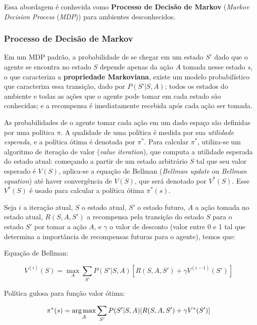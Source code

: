 Essa abordagem é conhecida como \textbf{Processo de Decisão de Markov} (\textit{Markov Decision Process} (\textit{MDP})) para ambientes desconhecidos.

\subsubsection{Processo de Decisão de Markov}
\label{sec:mdp}

Em um MDP padrão, a probabilidade de se chegar em um estado $S'$ dado que o agente se encontra no estado $S$ depende apenas da ação $A$ tomada nesse estado \textit{s}, o que caracteriza a \textbf{propriedade Markoviana}, existe um modelo probabilístico que caracteriza essa transição, dado por $P(S'|S,A)$; todos os estados do ambiente e todas as ações que o agente pode tomar em cada estado são conhecidas; e a recompensa é imediatamente recebida após cada ação ser tomada.

As probabilidades de o agente tomar cada ação em um dado espaço são definidas por uma política $\pi$. A qualidade de uma política é medida por sua \textit{utilidade esperada}, e a política ótima é denotada por $\pi^{*}$. Para calcular $\pi^{*}$, utiliza-se um algoritmo de iteração de valor (\textit{value iteration}), que computa a utilidade esperada do estado atual: começando a partir de um estado arbitrário $S$ tal que seu valor esperado é $V(S)$, aplica-se a equação de Bellman (\textit{Bellman update} ou \textit{Bellman equation}) até haver convergência de $V(S)$, que será denotado por $V^{*}(S)$. Esse $V^{*}(S)$ é usado para calcular a política ótima $\pi^{*}(s)$.

Seja $i$ a iteração atual, $S$ o estado atual, $S'$ o estado futuro, $A$ a ação tomada no estado atual, $R(S,A,S')$ a recompensa pela transição do estado $S$ para o estado $S'$ por tomar a ação $A$, e $\gamma$ o valor de desconto (valor entre 0 e 1 tal que determina a importância de recompensas futuras para o agente), temos que:

Equação de Bellman:

\begin{equation} \label{eq:bellman}
V^{(i)}(S) = \max_{A}\sum_{S'}P(S'|S,A)[R(S,A,S') + \gamma V^{(i-1)}(S')]
\end{equation}

Política gulosa para função valor ótima:

\begin{equation} \label{eq:opt_pol}
\pi^{*}(s) = \operatorname*{arg\,max}_{A}\sum_{S'}P(S'|S,A)[R(S,A,S') + \gamma V^{*}(S')]
\end{equation}

